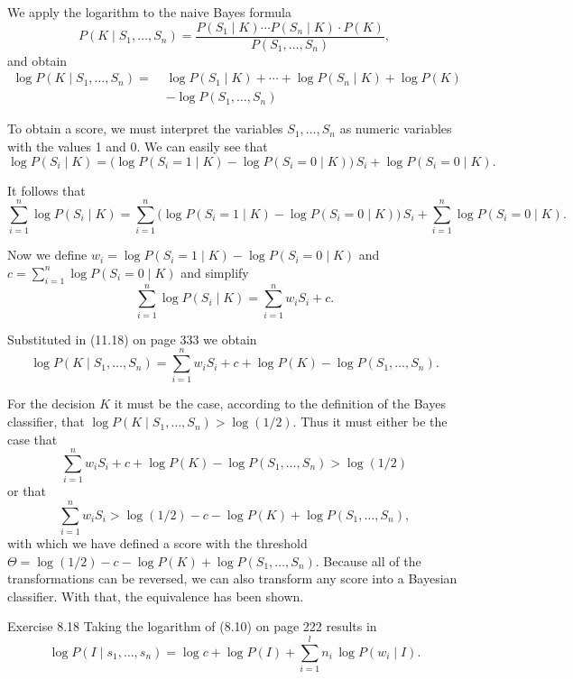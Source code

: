 \documentclass[10pt]{book}
\begin{document}
We apply the logarithm to the naive Bayes formula
\[
P\!\left(K \mid S_{1}, \ldots, S_{n}\right)=\frac{P\!\left(S_{1} \mid K\right)\cdots P\!\left(S_{n} \mid K\right)\cdot P(K)}{P\!\left(S_{1}, \ldots, S_{n}\right)},
\]
and obtain
\[
\begin{aligned}
\log P\!\left(K \mid S_{1}, \ldots, S_{n}\right)=\;& \log P\!\left(S_{1} \mid K\right)+\cdots+\log P\!\left(S_{n} \mid K\right)+\log P(K)\\
&-\log P\!\left(S_{1}, \ldots, S_{n}\right) \tag{11.18}
\end{aligned}
\]

To obtain a score, we must interpret the variables $S_{1}, \ldots, S_{n}$ as numeric variables with the values 1 and 0. We can easily see that
\[
\log P\!\left(S_{i} \mid K\right)=\bigl(\log P(S_{i}=1 \mid K)-\log P(S_{i}=0 \mid K)\bigr)\,S_{i}+\log P(S_{i}=0 \mid K).
\]

It follows that
\[
\sum_{i=1}^{n} \log P\!\left(S_{i} \mid K\right)=\sum_{i=1}^{n}\bigl(\log P(S_{i}=1 \mid K)-\log P(S_{i}=0 \mid K)\bigr)\,S_{i}+\sum_{i=1}^{n}\log P(S_{i}=0 \mid K).
\]

Now we define $w_{i}=\log P(S_{i}=1 \mid K)-\log P(S_{i}=0 \mid K)$ and $c=\sum_{i=1}^{n}\log P(S_{i}=0 \mid K)$ and simplify
\[
\sum_{i=1}^{n} \log P\!\left(S_{i} \mid K\right)=\sum_{i=1}^{n} w_{i} S_{i}+c.
\]

Substituted in (11.18) on page 333 we obtain
\[
\log P\!\left(K \mid S_{1}, \ldots, S_{n}\right)=\sum_{i=1}^{n} w_{i} S_{i}+c+\log P(K)-\log P\!\left(S_{1}, \ldots, S_{n}\right).
\]

For the decision $K$ it must be the case, according to the definition of the Bayes classifier, that $\log P\!\left(K \mid S_{1}, \ldots, S_{n}\right)>\log(1/2)$. Thus it must either be the case that
\[
\sum_{i=1}^{n} w_{i} S_{i}+c+\log P(K)-\log P\!\left(S_{1}, \ldots, S_{n}\right)>\log(1/2)
\]
or that
\[
\sum_{i=1}^{n} w_{i} S_{i}>\log(1/2)-c-\log P(K)+\log P\!\left(S_{1}, \ldots, S_{n}\right),
\]
with which we have defined a score with the threshold $\Theta=\log(1/2)-c-\log P(K)+\log P\!\left(S_{1}, \ldots, S_{n}\right)$. Because all of the transformations can be reversed, we can also transform any score into a Bayesian classifier. With that, the equivalence has been shown.

Exercise 8.18 Taking the logarithm of (8.10) on page 222 results in
\[
\log P\!\left(I \mid s_{1}, \ldots, s_{n}\right)=\log c+\log P(I)+\sum_{i=1}^{l} n_{i}\,\log P\!\left(w_{i} \mid I\right).
\]
\end{document}
